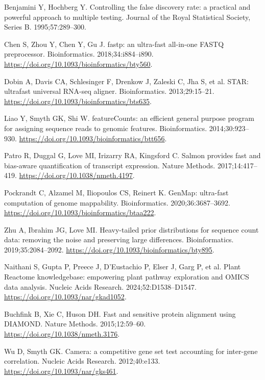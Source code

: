 \documentclass[referee,pdflatex,sn-basic,Numbered]{sn-jnl}
\begin{document}
\begin{enumerate}[label={[\arabic*]},itemsep=2pt,leftmargin=2.6em]
\item Benjamini Y, Hochberg Y. Controlling the false discovery rate: a practical and powerful approach to multiple testing. Journal of the Royal Statistical Society, Series B. 1995;57:289--300.

\item Chen S, Zhou Y, Chen Y, Gu J. fastp: an ultra-fast all-in-one FASTQ preprocessor. Bioinformatics. 2018;34:i884--i890. \url{https://doi.org/10.1093/bioinformatics/bty560}.

\item Dobin A, Davis CA, Schlesinger F, Drenkow J, Zaleski C, Jha S, et al. STAR: ultrafast universal RNA-seq aligner. Bioinformatics. 2013;29:15--21. \url{https://doi.org/10.1093/bioinformatics/bts635}.

\item Liao Y, Smyth GK, Shi W. featureCounts: an efficient general purpose program for assigning sequence reads to genomic features. Bioinformatics. 2014;30:923--930. \url{https://doi.org/10.1093/bioinformatics/btt656}.

\item Patro R, Duggal G, Love MI, Irizarry RA, Kingsford C. Salmon provides fast and bias-aware quantification of transcript expression. Nature Methods. 2017;14:417--419. \url{https://doi.org/10.1038/nmeth.4197}.

\item Pockrandt C, Alzamel M, Iliopoulos CS, Reinert K. GenMap: ultra-fast computation of genome mappability. Bioinformatics. 2020;36:3687--3692. \url{https://doi.org/10.1093/bioinformatics/btaa222}.

\item Zhu A, Ibrahim JG, Love MI. Heavy-tailed prior distributions for sequence count data: removing the noise and preserving large differences. Bioinformatics. 2019;35:2084--2092. \url{https://doi.org/10.1093/bioinformatics/bty895}.

\item Naithani S, Gupta P, Preece J, D'Eustachio P, Elser J, Garg P, et al. Plant Reactome knowledgebase: empowering plant pathway exploration and OMICS data analysis. Nucleic Acids Research. 2024;52:D1538--D1547. \url{https://doi.org/10.1093/nar/gkad1052}.

\item Buchfink B, Xie C, Huson DH. Fast and sensitive protein alignment using DIAMOND. Nature Methods. 2015;12:59--60. \url{https://doi.org/10.1038/nmeth.3176}.

\item Wu D, Smyth GK. Camera: a competitive gene set test accounting for inter-gene correlation. Nucleic Acids Research. 2012;40:e133. \url{https://doi.org/10.1093/nar/gks461}.


\end{enumerate}
\end{document}
